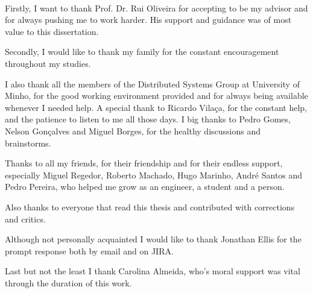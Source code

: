 
\paragraph{}


Firstly, I want to thank Prof. Dr. Rui Oliveira for accepting to be my advisor  and for always pushing me to work harder. His support and guidance was of most value to this dissertation.

Secondly, I would like to thank my family for the constant encouragement throughout my studies.

I also thank all the members of the Distributed Systems Group at University of Minho, for the good working environment provided and for always being available whenever I needed help. A special thank to Ricardo Vilaça, for the constant help, and the patience to listen to me all those days. I big thanks to Pedro Gomes, Nelson Gonçalves and Miguel Borges, for the healthy discussions and brainstorms. 

Thanks to all my friends, for their friendship and for their endless support, especially Miguel Regedor, Roberto Machado, Hugo Marinho, André Santos and Pedro Pereira, who helped me grow as an engineer, a student and a person. 

Also thanks to everyone that read this thesis and contributed with corrections and critics.

Although not personally acquainted I would like to thank Jonathan Ellis for the prompt response both by email and on JIRA.  

Last but not the least I thank Carolina Almeida, who's moral support was vital through the duration of this work. 
 